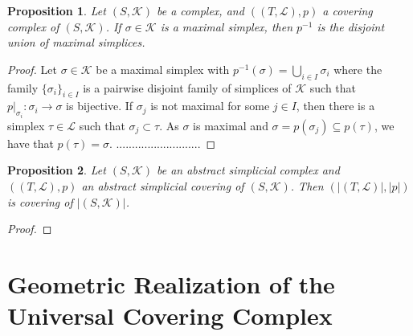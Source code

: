 \documentclass{amsart}
\newtheorem{proposition}{Proposition}[section]
\begin{document}
\begin{proposition}
Let $(S,\mathcal{K})$ be a complex, and $((T,\mathcal{L}),p)$ a covering complex of $(S,\mathcal{K})$. If $\sigma\in\mathcal{K}$ is a maximal simplex, then $p^{-1}$ is the disjoint union of maximal simplices.
\end{proposition}

\begin{proof}
Let $\sigma\in\mathcal{K}$ be a maximal simplex with  $p^{-1}(\sigma)=\bigcup_{i\in I}\sigma_i$ where the family $\{\sigma_i\}_{i\in I}$ is a pairwise disjoint family of simplices of $\mathcal{K}$ such that $p|_{\sigma_i}\colon \sigma_i\longrightarrow \sigma$ is bijective. If $\sigma_j$ is not maximal for some $j\in I$, then there is a simplex $\tau\in\mathcal{L}$ such that $\sigma_j\subset \tau$. As $\sigma$ is maximal and $\sigma=p(\sigma_j)\subseteq p(\tau)$, we have that $p(\tau)=\sigma$.        ...........................
\end{proof}




\begin{proposition}
Let $(S,\mathcal{K})$ be an abstract simplicial complex and $((T,\mathcal{L}),p)$ an abstract simplicial covering of $(S,\mathcal{K})$. Then $(\vert (T,\mathcal{L})\vert,\vert p\vert)$ is covering of $\vert (S,\mathcal{K})\vert$.
\end{proposition}

\begin{proof}

\end{proof}

\section{Geometric Realization of the Universal Covering Complex}





\end{document}
